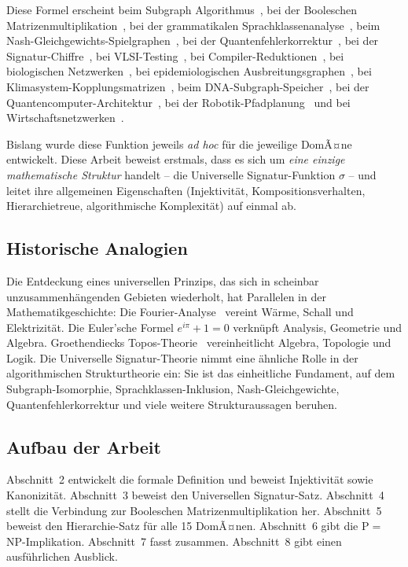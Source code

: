 ﻿\documentclass[a4paper,12pt]{article}
\theoremstyle{definition}
\begin{document}
Diese Formel erscheint beim Subgraph Algorithmus~\cite{epp2026subgraph},
bei der Booleschen Matrizenmultiplikation~\cite{epp2026boolmm},
bei der grammatikalen Sprachklassenanalyse~\cite{epp2026grammatik},
beim Nash-Gleichgewichts-Spielgraphen~\cite{epp2026spieltheorie},
bei der Quantenfehlerkorrektur~\cite{epp2026qecc},
bei der Signatur-Chiffre~\cite{epp2026sigchiffre},
bei VLSI-Testing~\cite{epp2026vlsi},
bei Compiler-Reduktionen~\cite{epp2026ccl},
bei biologischen Netzwerken~\cite{epp2026gen},
bei epidemiologischen Ausbreitungsgraphen~\cite{epp2026hantavirus},
bei Klimasystem-Kopplungsmatrizen~\cite{epp2026klima},
beim DNA-Subgraph-Speicher~\cite{epp2026dna},
bei der Quantencomputer-Architektur~\cite{epp2026qsubgraph},
bei der Robotik-Pfadplanung~\cite{epp2026robophi} und
bei Wirtschaftsnetzwerken~\cite{epp2026spieltheorie}.

Bislang wurde diese Funktion jeweils \emph{ad hoc} f\"ur die jeweilige DomÃ¤ne
entwickelt. Diese Arbeit beweist erstmals, dass es sich um \emph{eine einzige
mathematische Struktur} handelt -- die Universelle Signatur-Funktion $\sigma$ --
und leitet ihre allgemeinen Eigenschaften (Injektivit\"at, Kompositionsverhalten,
Hierarchietreue, algorithmische Komplexit\"at) auf einmal ab.

\subsection{Historische Analogien}

Die Entdeckung eines universellen Prinzips, das sich in scheinbar unzusammenh\"angenden
Gebieten wiederholt, hat Parallelen in der Mathematikgeschichte:
Die Fourier-Analyse~\cite{fourier1822} vereint W\"arme, Schall und Elektrizit\"at.
Die Euler'sche Formel $e^{i\pi}+1=0$ verkn\"upft Analysis, Geometrie und Algebra.
Groethendiecks Topos-Theorie~\cite{grothendieck1960} vereinheitlicht Algebra,
Topologie und Logik.
Die Universelle Signatur-Theorie nimmt eine \"ahnliche Rolle in der
algorithmischen Strukturtheorie ein: Sie ist das einheitliche Fundament, auf dem
Subgraph-Isomorphie, Sprachklassen-Inklusion, Nash-Gleichgewichte,
Quantenfehlerkorrektur und viele weitere Strukturaussagen beruhen.

\subsection{Aufbau der Arbeit}

Abschnitt~2 entwickelt die formale Definition und beweist Injektivit\"at
sowie Kanonizit\"at. Abschnitt~3 beweist den Universellen Signatur-Satz.
Abschnitt~4 stellt die Verbindung zur Booleschen Matrizenmultiplikation her.
Abschnitt~5 beweist den Hierarchie-Satz f\"ur alle 15 DomÃ¤nen.
Abschnitt~6 gibt die P$=$NP-Implikation. Abschnitt~7 fasst zusammen.
Abschnitt~8 gibt einen ausf\"uhrlichen Ausblick.
\end{document}

